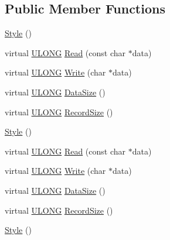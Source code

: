 \subsection*{Public Member Functions}
\begin{DoxyCompactItemize}
\item 
\hyperlink{struct_y_excel_1_1_workbook_1_1_style_a5bb7c4581a1fa80a1e72ad20bdcc9b6a}{Style} ()
\item 
virtual \hyperlink{_basic_excel_8hpp_abe09d1bea023be6a07cbadde8e955435}{U\+L\+O\+N\+G} \hyperlink{struct_y_excel_1_1_workbook_1_1_style_aa8839cc6f244bc9336984c74b79426b9}{Read} (const char $\ast$data)
\item 
virtual \hyperlink{_basic_excel_8hpp_abe09d1bea023be6a07cbadde8e955435}{U\+L\+O\+N\+G} \hyperlink{struct_y_excel_1_1_workbook_1_1_style_a8450ba6ca9a7ee6bfc250368fccbd7dc}{Write} (char $\ast$data)
\item 
virtual \hyperlink{_basic_excel_8hpp_abe09d1bea023be6a07cbadde8e955435}{U\+L\+O\+N\+G} \hyperlink{struct_y_excel_1_1_workbook_1_1_style_a1ae5a0aca5fefde8a36e0b74717622dd}{Data\+Size} ()
\item 
virtual \hyperlink{_basic_excel_8hpp_abe09d1bea023be6a07cbadde8e955435}{U\+L\+O\+N\+G} \hyperlink{struct_y_excel_1_1_workbook_1_1_style_a71e23c7944bcd497a7ed0a3771b5f364}{Record\+Size} ()
\item 
\hyperlink{struct_y_excel_1_1_workbook_1_1_style_a5bb7c4581a1fa80a1e72ad20bdcc9b6a}{Style} ()
\item 
virtual \hyperlink{_basic_excel_8hpp_abe09d1bea023be6a07cbadde8e955435}{U\+L\+O\+N\+G} \hyperlink{struct_y_excel_1_1_workbook_1_1_style_a3200e543cc86076dc7baf9820240c026}{Read} (const char $\ast$data)
\item 
virtual \hyperlink{_basic_excel_8hpp_abe09d1bea023be6a07cbadde8e955435}{U\+L\+O\+N\+G} \hyperlink{struct_y_excel_1_1_workbook_1_1_style_a43422b4d2ad8b3a7d5df218f21816a60}{Write} (char $\ast$data)
\item 
virtual \hyperlink{_basic_excel_8hpp_abe09d1bea023be6a07cbadde8e955435}{U\+L\+O\+N\+G} \hyperlink{struct_y_excel_1_1_workbook_1_1_style_aa05ac567a1a3090cc4ab78a89abc2ca4}{Data\+Size} ()
\item 
virtual \hyperlink{_basic_excel_8hpp_abe09d1bea023be6a07cbadde8e955435}{U\+L\+O\+N\+G} \hyperlink{struct_y_excel_1_1_workbook_1_1_style_a5f79d0c27333de0d0a1b93b75b0d3d22}{Record\+Size} ()
\item 
\hyperlink{struct_y_excel_1_1_workbook_1_1_style_a5bb7c4581a1fa80a1e72ad20bdcc9b6a}{Style} ()

\end{DoxyCompactItemize}
